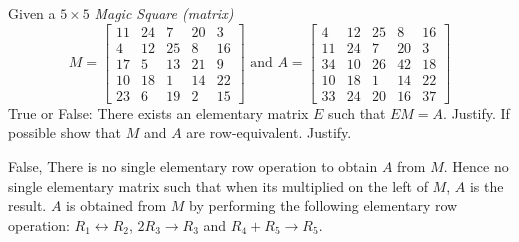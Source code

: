 
\begin{Exercise}[
name={},
title={}, 
difficulty=0,
origin={\cite{YL}}]
Given a $5\times 5$ \emph{Magic Square (matrix)}
\[
M=
\begin{bmatrix}
11&24&7&20&3\\
4&12&25&8&16\\
17&5&13&21&9\\
10&18&1&14&22\\
23&6&19&2&15
\end{bmatrix} \text{ and }
A=
\begin{bmatrix}
4&12&25&8&16\\
11&24&7&20&3\\
34&10&26&42&18\\
10&18&1&14&22\\
33&24&20&16&37
\end{bmatrix}
\]
\Question True or False: There exists an elementary matrix $E$ such that $EM=A$. Justify.
\Question If possible show that $M$ and $A$ are row-equivalent. Justify.
\end{Exercise}

\begin{Answer}
\Question False, There is no single elementary row operation to obtain $A$ from $M$.  Hence no single elementary matrix such that when its multiplied on the left of $M$, $A$ is the result.
\Question $A$ is obtained from $M$ by performing the following elementary row operation: $R_1\leftrightarrow R_2$, $2R_3\to R_3$ and $R_4+R_5\to R_5$. 
\end{Answer}
